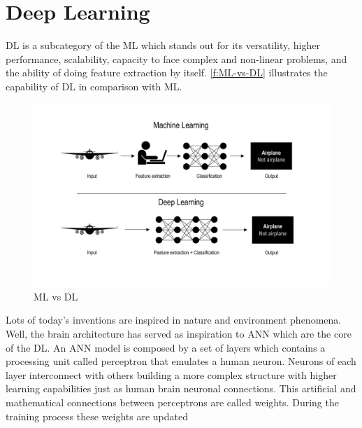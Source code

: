 \section{Deep Learning}
\label{s:Second-Background-Deep-Learning}

\ac{DL} is a subcategory of the \ac{ML} which stands out for its versatility, higher performance, scalability, capacity to face complex and non-linear problems, and the ability of doing feature extraction by itself. \autoref{f:ML-vs-DL} illustrates the capability of \ac{DL} in comparison with \ac{ML}. 

\begin{figure}[h]
\centering
\includegraphics[width=\linewidth]{figures/Ch2/MLvsDL.png}
\caption{ML vs DL}
\label{f:ML-vs-DL}
\end{figure}

Lots of today's inventions are inspired in nature and environment phenomena. Well, the brain architecture has served as inspiration to \ac{ANN} which are the core of the \ac{DL}. An \ac{ANN} model is composed by a set of layers which contains a processing unit called perceptron that emulates a human neuron. Neurons of each layer interconnect with others building a more complex structure with higher learning capabilities just as human brain neuronal connections. This artificial and mathematical connections between perceptrons are called weights. During the training process these weights are updated


